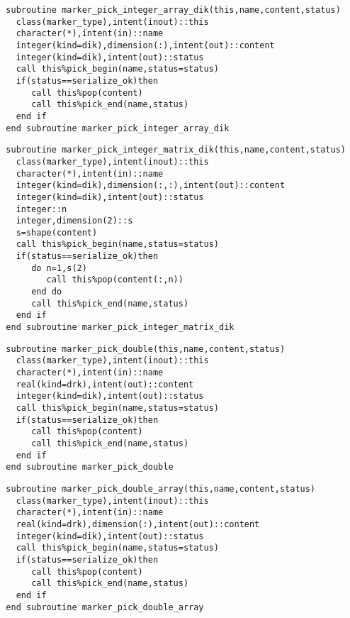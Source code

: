 \begin{Verbatim}
  subroutine marker_pick_integer_array_dik(this,name,content,status)
    class(marker_type),intent(inout)::this
    character(*),intent(in)::name
    integer(kind=dik),dimension(:),intent(out)::content
    integer(kind=dik),intent(out)::status
    call this%pick_begin(name,status=status)
    if(status==serialize_ok)then
       call this%pop(content)
       call this%pick_end(name,status)
    end if
  end subroutine marker_pick_integer_array_dik
\end{Verbatim}

\begin{Verbatim}
  subroutine marker_pick_integer_matrix_dik(this,name,content,status)
    class(marker_type),intent(inout)::this
    character(*),intent(in)::name
    integer(kind=dik),dimension(:,:),intent(out)::content
    integer(kind=dik),intent(out)::status
    integer::n
    integer,dimension(2)::s
    s=shape(content)
    call this%pick_begin(name,status=status)
    if(status==serialize_ok)then
       do n=1,s(2)
          call this%pop(content(:,n))
       end do
       call this%pick_end(name,status)
    end if
  end subroutine marker_pick_integer_matrix_dik
\end{Verbatim}

\begin{Verbatim}
  subroutine marker_pick_double(this,name,content,status)
    class(marker_type),intent(inout)::this
    character(*),intent(in)::name
    real(kind=drk),intent(out)::content
    integer(kind=dik),intent(out)::status
    call this%pick_begin(name,status=status)
    if(status==serialize_ok)then
       call this%pop(content)
       call this%pick_end(name,status)
    end if
  end subroutine marker_pick_double
\end{Verbatim}

\begin{Verbatim}
  subroutine marker_pick_double_array(this,name,content,status)
    class(marker_type),intent(inout)::this
    character(*),intent(in)::name
    real(kind=drk),dimension(:),intent(out)::content
    integer(kind=dik),intent(out)::status
    call this%pick_begin(name,status=status)
    if(status==serialize_ok)then
       call this%pop(content)
       call this%pick_end(name,status)
    end if
  end subroutine marker_pick_double_array
\end{Verbatim}

